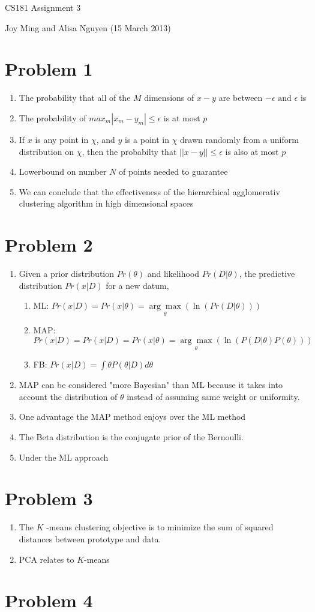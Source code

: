 \documentclass[11pt]{article}
\begin{document}
\begin{center}
\large
CS181 Assignment 3
\end{center}
Joy Ming and Alisa Nguyen (15 March 2013)\\

\section{Problem 1}
\begin{enumerate}
\item The probability that all of the $M$ dimensions of $x - y$ are between $-\epsilon \text{ and } \epsilon$ is
\item The probability of $max_m |x_m - y_m| \leq \epsilon$ is at most $p$
\item If $x$ is any point in $\chi$, and $y$ is a point in $\chi$ drawn randomly from a uniform distribution on $\chi$, then the probabilty that $||x - y|| \leq \epsilon$ is also at most $p$
\item Lowerbound on number $N$ of points needed to guarantee
\item We can conclude that the effectiveness of the hierarchical agglomerativ clustering algorithm in high dimensional spaces
\end{enumerate}

\section{Problem 2}
\begin{enumerate}
\item Given a prior distribution $Pr(\theta)$ and likelihood $Pr(D|\theta)$, the predictive distribution $Pr(x|D)$ for a new datum, 
	\begin{enumerate}
	\item ML: $Pr(x|D)=Pr(x|\theta)=\underset{\theta}{\arg\max}(\ln(Pr(D|\theta)))$
	\item MAP: $Pr(x|D)=Pr(x|D)=Pr(x|\theta)=\underset{\theta}{\arg\max}(\ln(P(D|\theta)P(\theta)))$
	\item FB: $Pr(x|D)=\int \theta P(\theta|D)d\theta$
	\end{enumerate}
\item MAP can be considered "more Bayesian" than ML because it takes into account the distribution of $\theta$ instead of assuming same weight or uniformity.
\item One advantage the MAP method enjoys over the ML method
\item The Beta distribution is the conjugate prior of the Bernoulli.
\item Under the ML approach
\end{enumerate}

\section{Problem 3}
\begin{enumerate}
\item The $K$ -means clustering objective is to minimize the sum of squared distances between prototype and data.
\item PCA relates to $K$-means
\end{enumerate}

\section{Problem 4}
\end{document}
